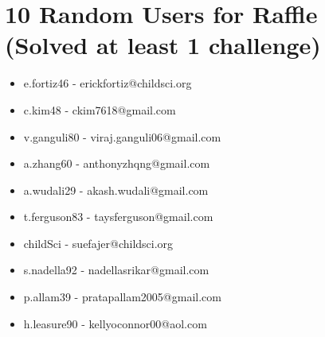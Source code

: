 \documentclass{article}
\begin{document}
    \section*{10 Random Users for Raffle (Solved at least 1 challenge)}
    \begin{multicols}{2}
    \begin{itemize}
        \item e.fortiz46 - erickfortiz@childsci.org
        \item c.kim48 - ckim7618@gmail.com
        \item v.ganguli80 - viraj.ganguli06@gmail.com
        \item a.zhang60 - anthonyzhqng@gmail.com
        \item a.wudali29 - akash.wudali@gmail.com
        \item t.ferguson83 - taysferguson@gmail.com
        \item childSci - suefajer@childsci.org
        \item s.nadella92 - nadellasrikar@gmail.com
        \item p.allam39 - pratapallam2005@gmail.com
        \item h.leasure90 - kellyoconnor00@aol.com
    \end{itemize}
    \end{multicols}

    
\end{document}
